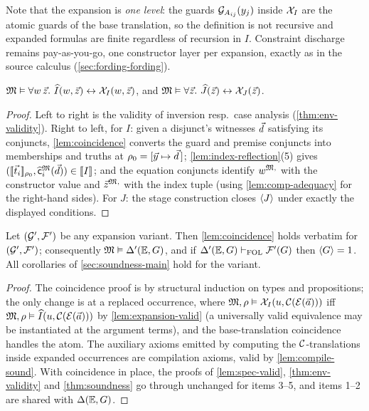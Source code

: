 Note that the expansion is \emph{one level}: the guards
$\mathcal{G}_{A_{ij}}(y_j)$ inside $\mathcal{X}_{I}$ are the atomic guards of the base
translation, so the definition is not recursive and expanded formulas
are finite regardless of recursion in $I$.  Constraint discharge remains
pay-as-you-go, one constructor layer per expansion, exactly as in the
source calculus (\cref{sec:fording-fording}).

\begin{lemma}
\label{lem:expansion-valid}
$\mathfrak{M} \vDash \forall w\,\vec{z}.\ \widehat{I}(w, \vec{z}) \leftrightarrow
\mathcal{X}_{I}(w, \vec{z})$, and $\mathfrak{M} \vDash \forall \vec{z}.\
\widehat{J}(\vec{z}) \leftrightarrow \mathcal{X}_{J}(\vec{z})$.
\end{lemma}

\begin{proof}
Left to right is the validity of inversion resp.\ case analysis
(\cref{thm:env-validity}).  Right to left, for $I$: given a disjunct's
witnesses $\vec{d}$ satisfying its conjuncts, \cref{lem:coincidence}
converts the guard and premise conjuncts into memberships and truths at
$\rho_0 = [\vec{y} \mapsto \vec{d}\,]$;
\cref{lem:index-reflection}(5) gives $([\![ \vec{t}_i ]\!]_{\rho_0},
\widehat{\mathsf{c}}_i^{\mathfrak{M}}(\vec{d})) \in [\![ I ]\!]_{}$; and the equation
conjuncts identify $w^{\mathfrak{M},}$ with the constructor value and
$\vec{z}^{\mathfrak{M},}$ with the index tuple (using \cref{lem:comp-adequacy}
for the right-hand sides).  For $J$: the stage construction closes
$\langle J \rangle$ under exactly the displayed conditions.
\end{proof}

\begin{theorem}
\label{thm:expansion}
Let $(\mathcal{G}', \mathcal{F}')$ be any expansion variant.  Then
\cref{lem:coincidence} holds verbatim for $(\mathcal{G}', \mathcal{F}')$;
consequently $\mathfrak{M} \vDash \Delta'(\mathbb{E},G)$, and if $\Delta'(\mathbb{E},G)
\vdash_{\mathrm{FOL}} \mathcal{F}'(G)$ then $\langle G \rangle = 1$.  All corollaries of
\cref{sec:soundness-main} hold for the variant.
\end{theorem}

\begin{proof}
The coincidence proof is by structural induction on types and
propositions; the only change is at a replaced occurrence, where
$\mathfrak{M}, \rho \vDash \mathcal{X}_{I}(u, \mathcal{C}(\mathcal{E}(\vec{a})))$ iff $\mathfrak{M}, \rho
\vDash \widehat{I}(u, \mathcal{C}(\mathcal{E}(\vec{a})))$ by
\cref{lem:expansion-valid} (a universally valid equivalence may be
instantiated at the argument terms), and the base-translation
coincidence handles the atom.  The auxiliary axioms emitted by
computing the $\mathcal{C}$-translations inside expanded occurrences are
compilation axioms, valid by \cref{lem:compile-sound}.  With
coincidence in place, the proofs of \cref{lem:spec-valid},
\cref{thm:env-validity} and \cref{thm:soundness} go through unchanged
for items 3--5, and items 1--2 are shared with $\Delta(\mathbb{E},G)$.
\end{proof}

